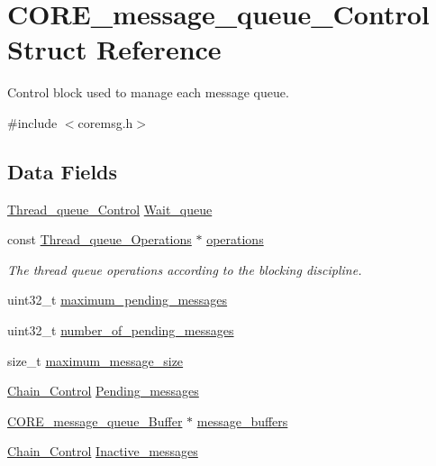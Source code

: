 \hypertarget{structCORE__message__queue__Control}{}\section{C\+O\+R\+E\+\_\+message\+\_\+queue\+\_\+\+Control Struct Reference}
\label{structCORE__message__queue__Control}


Control block used to manage each message queue.  




{\ttfamily \#include $<$coremsg.\+h$>$}

\subsection*{Data Fields}
\begin{DoxyCompactItemize}
\item 
\mbox{\hyperlink{structThread__queue__Control}{Thread\+\_\+queue\+\_\+\+Control}} \mbox{\hyperlink{structCORE__message__queue__Control_abc0cfb9192140c3121e492f62e3f9ce3}{Wait\+\_\+queue}}
\item 
\mbox{\label{structCORE__message__queue__Control_a3c54d06012eebd396756307ad6881e67}} 
const \mbox{\hyperlink{structThread__queue__Operations}{Thread\+\_\+queue\+\_\+\+Operations}} $\ast$ \mbox{\hyperlink{structCORE__message__queue__Control_a3c54d06012eebd396756307ad6881e67}{operations}}
\begin{DoxyCompactList}\small\item\em The thread queue operations according to the blocking discipline. \end{DoxyCompactList}\item 
uint32\+\_\+t \mbox{\hyperlink{structCORE__message__queue__Control_ae211827749d269377efe4b537dcbd08f}{maximum\+\_\+pending\+\_\+messages}}
\item 
uint32\+\_\+t \mbox{\hyperlink{structCORE__message__queue__Control_a8165e207a6213cfb3c3aa2198253a5ec}{number\+\_\+of\+\_\+pending\+\_\+messages}}
\item 
size\+\_\+t \mbox{\hyperlink{structCORE__message__queue__Control_a59b5fa85a2ecca32875957b854f17d88}{maximum\+\_\+message\+\_\+size}}
\item 
\mbox{\hyperlink{unionChain__Control}{Chain\+\_\+\+Control}} \mbox{\hyperlink{structCORE__message__queue__Control_ac34a2906ce33b149caf25015d596fb27}{Pending\+\_\+messages}}
\item 
\mbox{\hyperlink{structCORE__message__queue__Buffer}{C\+O\+R\+E\+\_\+message\+\_\+queue\+\_\+\+Buffer}} $\ast$ \mbox{\hyperlink{structCORE__message__queue__Control_ab2aa8d674efa7896c16efccef4806910}{message\+\_\+buffers}}
\item 
\mbox{\hyperlink{unionChain__Control}{Chain\+\_\+\+Control}} \mbox{\hyperlink{structCORE__message__queue__Control_a2f5da79e2c1094cc5ee810c98579d406}{Inactive\+\_\+messages}}
\end{DoxyCompactItemize}


